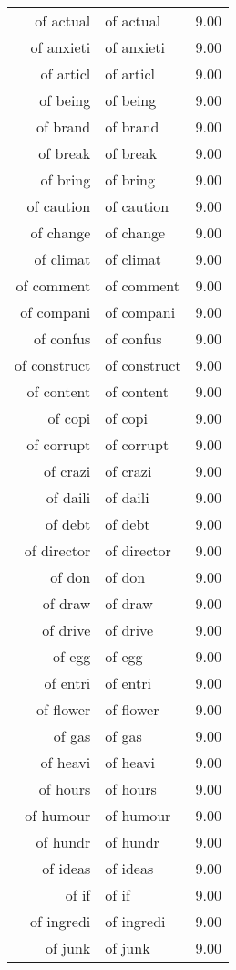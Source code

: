 \begin{table}[ht]
\begin{tabular}{rlr}
  of actual & of actual & 9.00 \\ 
  of anxieti & of anxieti & 9.00 \\ 
  of articl & of articl & 9.00 \\ 
  of being & of being & 9.00 \\ 
  of brand & of brand & 9.00 \\ 
  of break & of break & 9.00 \\ 
  of bring & of bring & 9.00 \\ 
  of caution & of caution & 9.00 \\ 
  of change & of change & 9.00 \\ 
  of climat & of climat & 9.00 \\ 
  of comment & of comment & 9.00 \\ 
  of compani & of compani & 9.00 \\ 
  of confus & of confus & 9.00 \\ 
  of construct & of construct & 9.00 \\ 
  of content & of content & 9.00 \\ 
  of copi & of copi & 9.00 \\ 
  of corrupt & of corrupt & 9.00 \\ 
  of crazi & of crazi & 9.00 \\ 
  of daili & of daili & 9.00 \\ 
  of debt & of debt & 9.00 \\ 
  of director & of director & 9.00 \\ 
  of don & of don & 9.00 \\ 
  of draw & of draw & 9.00 \\ 
  of drive & of drive & 9.00 \\ 
  of egg & of egg & 9.00 \\ 
  of entri & of entri & 9.00 \\ 
  of flower & of flower & 9.00 \\ 
  of gas & of gas & 9.00 \\ 
  of heavi & of heavi & 9.00 \\ 
  of hours & of hours & 9.00 \\ 
  of humour & of humour & 9.00 \\ 
  of hundr & of hundr & 9.00 \\ 
  of ideas & of ideas & 9.00 \\ 
  of if & of if & 9.00 \\ 
  of ingredi & of ingredi & 9.00 \\ 
  of junk & of junk & 9.00 \\ 

\end{tabular}
\end{table}
